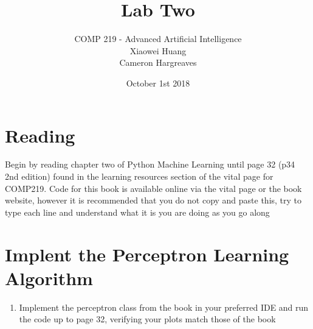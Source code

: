 \documentclass[12pt]{article}
\begin{document}


\date{October 1st 2018}
 
 
\title{Lab Two}%
\author{COMP 219 - Advanced Artificial Intelligence \\
		Xiaowei Huang \\ 
		Cameron Hargreaves\\}
 
\maketitle

\section{Reading}
Begin by reading chapter two of Python Machine Learning until page 32 (p34 2nd edition) found in the learning resources section of the vital page for COMP219. Code for this book is available online via the vital page or the book website, however it is recommended that you do not copy and paste this, try to type each line and understand what it is you are doing as you go along

\section{Implent the Perceptron Learning Algorithm}
\begin{enumerate}
\item Implement the perceptron class from the book in your preferred IDE and run the code up to page 32, verifying your plots match those of the book
\end{enumerate}
\end{document}
